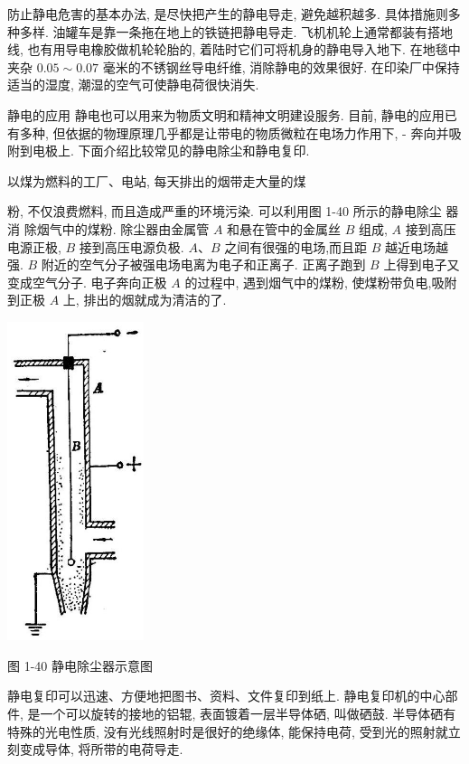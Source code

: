 \documentclass[10pt]{article}
\begin{document}
防止静电危害的基本办法, 是尽快把产生的静电导走, 避免越积越多. 具体措施则多种多样. 油罐车是靠一条拖在地上的铁链把静电导走. 飞机机轮上通常都装有搭地线, 也有用导电橡胶做机轮轮胎的, 着陆时它们可将机身的静电导入地下. 在地毯中夹杂 \({0.05} \sim {0.07}\) 毫米的不锈钢丝导电纤维, 消除静电的效果很好. 在印染厂中保持适当的湿度, 潮湿的空气可使静电荷很快消失.

静电的应用 静电也可以用来为物质文明和精神文明建设服务. 目前, 静电的应用已有多种, 但依据的物理原理几乎都是让带电的物质微粒在电场力作用下, - 奔向并吸附到电极上. 下面介绍比较常见的静电除尘和静电复印.

以煤为燃料的工厂、电站, 每天排出的烟带走大量的煤

粉, 不仅浪费燃料, 而且造成严重的环境污染. 可以利用图 1-40 所示的静电除尘 器 消 除烟气中的煤粉. 除尘器由金属管 \(A\) 和悬在管中的金属丝 \(B\) 组成, \(A\) 接到高压电源正极, \(B\) 接到高压电源负极. \(A\text{、}B\) 之间有很强的电场,而且距 \(B\) 越近电场越强. \(B\) 附近的空气分子被强电场电离为电子和正离子. 正离子跑到 \(B\) 上得到电子又变成空气分子. 电子奔向正极 \(A\) 的过程中, 遇到烟气中的煤粉, 使煤粉带负电,吸附到正极 \(A\) 上, 排出的烟就成为清洁的了.

\begin{center}
\includegraphics[max width=0.3\textwidth]{images/01913056-1f15-74d8-9184-9aab52c9d66b_52_153305.jpg}
\end{center}

图 1-40 静电除尘器示意图

静电复印可以迅速、方便地把图书、资料、文件复印到纸上. 静电复印机的中心部件, 是一个可以旋转的接地的铝辊, 表面镀着一层半导体硒, 叫做硒鼓. 半导体硒有特殊的光电性质, 没有光线照射时是很好的绝缘体, 能保持电荷, 受到光的照射就立刻变成导体, 将所带的电荷导走.
\end{document}
